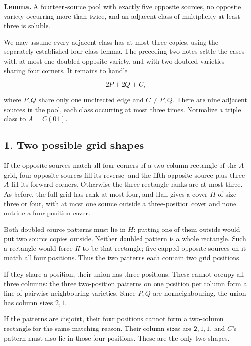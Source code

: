 \documentclass[
  10pt,
]{article}
\begin{document}
\textbf{Lemma.} A fourteen-source pool with exactly five opposite
sources, no opposite variety occurring more than twice, and an adjacent
class of multiplicity at least three is soluble.

We may assume every adjacent class has at most three copies, using the
separately established four-class lemma. The preceding two notes settle
the cases with at most one doubled opposite variety, and with two
doubled varieties sharing four corners. It remains to handle

\[
2P+2Q+C,
\]

where \(P,Q\) share only one undirected edge and \(C\ne P,Q\). There are
nine adjacent sources in the pool, each class occurring at most three
times. Normalize a triple class to \(A=C(01)\).

\hypertarget{two-possible-grid-shapes}{%
\subsection*{1. Two possible grid
shapes}\label{two-possible-grid-shapes}}

If the opposite sources match all four corners of a two-column rectangle
of the \(A\) grid, four opposite sources fill its reverse, and the fifth
opposite source plus three \(A\) fill its forward corners. Otherwise the
three rectangle ranks are at most three. As before, the full grid has
rank at most four, and Hall gives a cover \(H\) of size three or four,
with at most one source outside a three-position cover and none outside
a four-position cover.

Both doubled source patterns must lie in \(H\): putting one of them
outside would put two source copies outside. Neither doubled pattern is
a whole rectangle. Such a rectangle would force \(H\) to be that
rectangle; five capped opposite sources on it match all four positions.
Thus the two patterns each contain two grid positions.

If they share a position, their union has three positions. These cannot
occupy all three columns: the three two-position patterns on one
position per column form a line of pairwise neighbouring varieties.
Since \(P,Q\) are nonneighbouring, the union has column sizes \(2,1\).

If the patterns are disjoint, their four positions cannot form a
two-column rectangle for the same matching reason. Their column sizes
are \(2,1,1\), and \(C\)'s pattern must also lie in those four
positions. These are the only two shapes.
\end{document}
